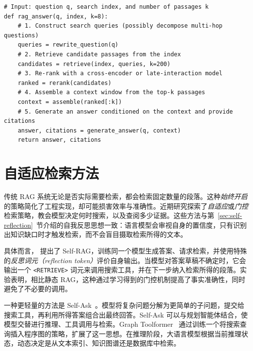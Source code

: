 \begin{listing}[!ht]
\begin{verbatim}
# Input: question q, search index, and number of passages k
def rag_answer(q, index, k=8):
    # 1. Construct search queries (possibly decompose multi-hop questions)
    queries = rewrite_question(q)
    # 2. Retrieve candidate passages from the index
    candidates = retrieve(index, queries, k=200)
    # 3. Re-rank with a cross-encoder or late-interaction model
    ranked = rerank(candidates)
    # 4. Assemble a context window from the top-k passages
    context = assemble(ranked[:k])
    # 5. Generate an answer conditioned on the context and provide citations
    answer, citations = generate_answer(q, context)
    return answer, citations
\end{verbatim}
\caption{基本 RAG 系统的高层流程}
\label{lst:basicrag}
\end{listing}

\section{自适应检索方法}\label{sec:adaptive}
传统 RAG 系统无论是否实际需要检索，都会检索固定数量的段落。这种{\em 始终开启}的策略简化了工程实现，却可能损害效率与准确性。近期研究探索了\emph{自适应}或\emph{门控}检索策略，教会模型决定何时搜索，以及查阅多少证据。这些方法与第~\ref{sec:self-reflection}~节介绍的自我反思思想一致：语言模型会审视自身的置信度，只有识别出知识缺口时才触发检索，而不会盲目摄取检索所得的文本。

具体而言，\citet{asai2023selfrag} 提出了 Self-RAG，训练同一个模型生成答案、请求检索，并使用特殊的\emph{反思词元（reflection token）}评价自身输出。当模型对答案草稿不确定时，它会输出一个 \texttt{<RETRIEVE>} 词元来调用搜索工具，并在下一步纳入检索所得的段落。实验表明，相比静态 RAG，这种通过学习得到的门控机制提高了事实准确性，同时避免了不必要的调用。

一种更轻量的方法是 Self-Ask~\citep{press2022measuring}。模型将复杂问题分解为更简单的子问题，提交给搜索工具，再利用所得答案组合出最终回答。Self-Ask 可以与规划智能体结合，使模型交替进行推理、工具调用与检索。Graph Toolformer~\citep{zhang2023graph} 通过训练一个将搜索查询插入程序图的策略，扩展了这一思想。在推理阶段，大语言模型根据当前推理状态，动态决定是从文本索引、知识图谱还是数据库中检索。

